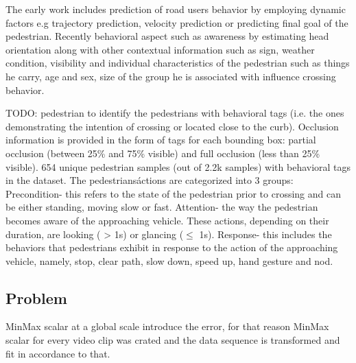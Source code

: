 The early work includes prediction of road users behavior by employing dynamic factors e.g trajectory prediction, velocity prediction or predicting final goal of the pedestrian. Recently behavioral aspect such as awareness by estimating head orientation along with other contextual information such as sign, weather condition, visibility and individual characteristics of the pedestrian such as things he carry, age and sex, size of the group he is associated with influence crossing behavior.

TODO:  pedestrian to identify the pedestrians with behavioral tags (i.e. the ones demonstrating the intention of crossing or located close to the curb). 
Occlusion information is provided in the form of tags for
each bounding box: partial occlusion (between 25\% and 75\%
visible) and full occlusion (less than 25\% visible).
 654 unique pedestrian samples (out of 2.2k samples) with behavioral tags in the
dataset. 
The
pedestrians\' actions are categorized into 3 groups: Precondition- this refers to the state of the pedestrian prior to crossing and can be either standing, moving slow or fast. Attention- the way the pedestrian becomes aware of the approaching vehicle. These actions, depending on their duration, are looking ( > 1s) or glancing ($\leq$ 1s). Response- this
includes the behaviors that pedestrians exhibit in response
to the action of the approaching vehicle, namely, stop, clear path, slow down, speed up, hand gesture and nod.

\subsection{Problem}
MinMax scalar at a global scale introduce the error, for that reason MinMax scalar for every video clip was crated and the data sequence is transformed and fit in accordance to that.
 

